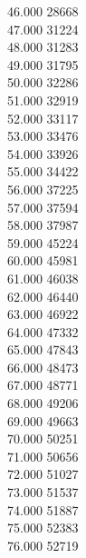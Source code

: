 { 46.000	28668 \\
 47.000	31224 \\
 48.000	31283 \\
 49.000	31795 \\
 50.000	32286 \\
 51.000	32919 \\
 52.000	33117 \\
 53.000	33476 \\
 54.000	33926 \\
 55.000	34422 \\
 56.000	37225 \\
 57.000	37594 \\
 58.000	37987 \\
 59.000	45224 \\
 60.000	45981 \\
 61.000	46038 \\
 62.000	46440 \\
 63.000	46922 \\
 64.000	47332 \\
 65.000	47843 \\
 66.000	48473 \\
 67.000	48771 \\
 68.000	49206 \\
 69.000	49663 \\
 70.000	50251 \\
 71.000	50656 \\
 72.000	51027 \\
 73.000	51537 \\
 74.000	51887 \\
 75.000	52383 \\
 76.000	52719 \\
}
